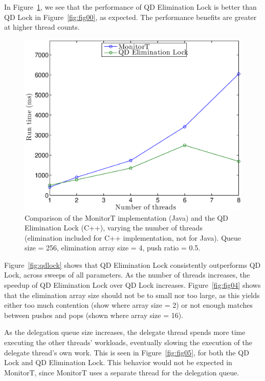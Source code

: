 
In Figure~\ref{fig:fig02}, we see that the performance of QD Elimination Lock is better than QD Lock in Figure~\ref{fig:fig00}, as expected. The performance benefits are greater at higher thread counts.

\begin{figure}[!h]
\centering
\includegraphics[width=.75\textwidth]{figs/02_TimeVsThreads_cppElim_javaNoElim.eps}
\caption[]{Comparison of the MonitorT implementation (Java) and the QD Elimination Lock (C++), varying the number of threads (elimination included for C++ implementation, not for Java). Queue size = 256, elimination array size = 4, push ratio = 0.5.}
\label{fig:fig02}
\end{figure}


Figure~\ref{fig:qdlock} shows that QD Elimination Lock consistently outperforms QD Lock, across sweeps of all parameters. As the number of threads increases, the speedup of QD Elimination Lock over QD Lock increases. Figure~\ref{fig:fig04} shows that the elimination array size should not be to small nor too large, as this yields either too much contention (show where array size = 2) or not enough matches between pushes and pops (shown where array size = 16).

As the delegation queue size increases, the delegate thread spends more time executing the other threads' workloads, eventually slowing the execution of the delegate thread's own work. This is seen in Figure~\ref{fig:fig05}, for both the QD Lock and QD Elimination Lock. This behavior would not be expected in MonitorT, since MonitorT uses a separate thread for the delegation queue.

